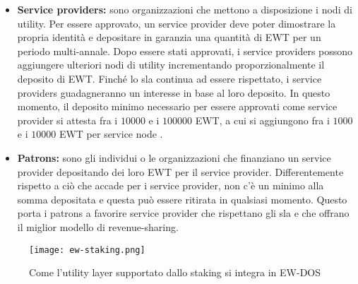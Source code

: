 \begin{itemize}
    \item \textbf{Service providers:} sono organizzazioni che mettono a disposizione i nodi di utility.
          Per essere approvato, un service provider deve poter dimostrare la propria identità e depositare in garanzia una quantità di EWT per un periodo multi-annale.
          Dopo essere stati approvati, i service providers possono aggiungere ulteriori nodi di utility incrementando proporzionalmente il deposito di EWT.
          Finché lo \gls{sla} continua ad essere rispettato, i service providers guadagneranno un interesse in base al loro deposito.
          In questo momento, il deposito minimo necessario per essere approvati come service provider si attesta fra i $10000$ e i $100000$ EWT, a cui si aggiungono fra i $1000$ e i $10000$ EWT per service node \cite{art:ew-staking}.
    \item \textbf{Patrons:} sono gli individui o le organizzazioni che finanziano un service provider depositando dei loro EWT per il service provider.
          Differentemente rispetto a ciò che accade per i service provider, non c'è un minimo alla somma depositata e questa può essere ritirata in qualsiasi momento.
          Questo porta i patrons a favorire service provider che rispettano gli \gls{sla} e che offrano il miglior modello di revenue-sharing.
\end{itemize}

\begin{figure}[h]
    \texttt{[image: ew-staking.png]}
    \centering
    \caption{Come l'utility layer supportato dallo staking si integra in EW-DOS \cite{art:ew-staking}}
    \label{lab:ew-staking}
\end{figure}